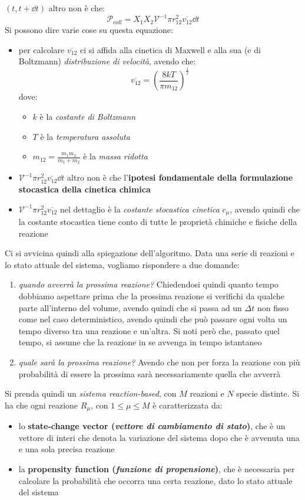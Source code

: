 \documentclass[a4paper,12pt, oneside]{book}
\begin{document}
$(t,t+\dd{t})$ altro non è che: 
\[\mathcal{P}_{coll}=X_1X_2\mathcal{V}^{-1}\pi r_{12}^2\overline{v_{12}}\dd{t}\]
Si possono dire varie cose su questa equazione:
\begin{itemize}
  \item per calcolare $\overline{v_{12}}$ ci si affida alla cinetica di Maxwell
  e alla sua (e di Boltzmann) \textit{distribuzione di velocità},
  avendo che:
  \[\overline{v_{12}}=\left(\frac{8kT}{\pi m_{12}}\right)^{\frac{1}{2}}\]
  dove:
  \begin{itemize}
    \item $k$ è la \textit{costante di Boltzmann}
    \item $T$ è la \textit{temperatura assoluta}
    \item $m_{12}=\frac{m_1m_2}{m_1+m_2}$ è la \textit{massa ridotta}
  \end{itemize}
  \item $\mathcal{V}^{-1}\pi r_{12}^2\overline{v_{12}}\dd{t}$ altro non è che
  l'\textbf{ipotesi fondamentale della formulazione stocastica della cinetica
    chimica} 
  \item $\mathcal{V}^{-1}\pi r_{12}^2\overline{v_{12}}$ nel dettaglio è la
  \textit{costante stocastica cinetica} $c_\mu$, avendo quindi che la costante
  stocastica tiene conto di tutte le proprietà chimiche e fisiche della reazione 
\end{itemize}
Ci si avvicina quindi alla spiegazione dell'algoritmo. Data una serie di
reazioni e lo stato attuale del sistema, vogliamo rispondere a due domande:
\begin{enumerate}
  \item \textit{quando avverrà la prossima reazione?} Chiedendosi quindi quanto
  tempo dobbiamo aspettare prima che la prossima reazione si verifichi da
  qualche parte all'interno del volume, avendo quindi che si passa ad un
  $\Delta t$ non fisso come nel caso deterministico, avendo quindi che può
  passare ogni volta un tempo diverso tra una reazione e un'altra. Si noti però
  che, passato quel tempo, si assume che la reazione in se avvenga in tempo
  istantaneo 
  \item \textit{quale sarà la prossima reazione?} Avendo che non per forza la
  reazione con più probabilità di essere la prossima sarà necessariamente quella
  che avverrà
\end{enumerate}
Si prenda quindi un \textit{sistema reaction-based}, con $M$ reazioni e $N$
specie distinte. Si ha che 
ogni reazione $R_\mu$, con $1\leq \mu\leq M$ è caratterizzata da:
\begin{itemize}
  \item lo \textbf{state-change vector (\textit{vettore di cambiamento di
      stato})}, che è un vettore di interi che denota la variazione del sistema
  dopo che è avvenuta una e una sola precisa reazione
  \item la \textbf{propensity function (\textit{funzione di propensione})}, che
  è necessaria per calcolare la probabilità che occorra una certa reazione, dato
  lo stato attuale del sistema
\end{itemize}
\end{document}

